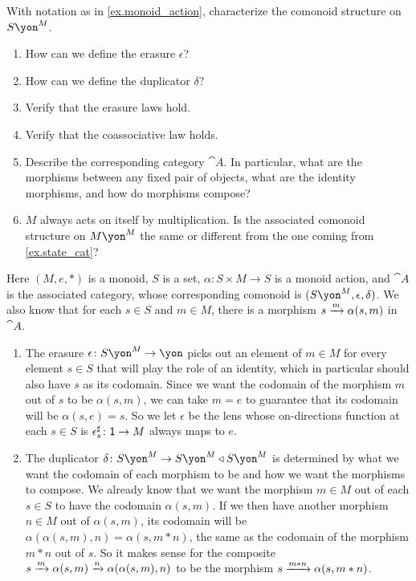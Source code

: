 \documentclass[Book-Poly]{subfiles}
\begin{document}
\begin{exercise}
With notation as in \cref{ex.monoid_action}, characterize the comonoid structure on $S\yon^M$.
\begin{enumerate}
    \item How can we define the erasure $\epsilon$?
    \item How can we define the duplicator $\delta$?
    \item Verify that the erasure laws hold.
    \item Verify that the coassociative law holds.
    \item Describe the corresponding category $\cat{A}$.
    In particular, what are the morphisms between any fixed pair of objects, what are the identity morphisms, and how do morphisms compose?
	\item $M$ always acts on itself by multiplication. Is the associated comonoid structure on $M\yon^M$ the same or different from the one coming from \cref{ex.state_cat}?
\qedhere
\end{enumerate}
\begin{solution}
Here $(M,e,*)$ is a monoid, $S$ is a set, $\alpha\colon S\times M\to S$ is a monoid action, and $\cat{A}$ is the associated category, whose corresponding comonoid is $(S\yon^M,\epsilon,\delta)$.
We also know that for each $s\in S$ and $m\in M$, there is a morphism $s\xrightarrow{m} \alpha(s,m)$ in $\cat{A}$.
\begin{enumerate}
    \item The erasure $\epsilon\colon S\yon^M\to\yon$ picks out an element of $m\in M$ for every element $s\in S$ that will play the role of an identity, which in particular should also have $s$ as its codomain.
    Since we want the codomain of the morphism $m$ out of $s$ to be $\alpha(s,m)$, we can take $m=e$ to guarantee that its codomain will be $\alpha(s,e)=s$.
    So we let $\epsilon$ be the lens whose on-directions function at each $s\in S$ is $\epsilon^\sharp_s\colon\textsf{1}\to M$ always maps to $e$.
    \item The duplicator $\delta\colon S\yon^M\to S\yon^M\tri S\yon^M$ is determined by what we want the codomain of each morphism to be and how we want the morphisms to compose.
    We already know that we want the morphism $m\in M$ out of each $s\in S$ to have the codomain $\alpha(s,m)$.
    If we then have another morphism $n\in M$ out of $\alpha(s,m)$, its codomain will be $\alpha(\alpha(s,m),n)=\alpha(s,m*n)$, the same as the codomain of the morphism $m*n$ out of $s$.
    So it makes sense for the composite $s\xrightarrow{m}\alpha(s,m)\xrightarrow{n} \alpha(\alpha(s,m),n)$ to be the morphism $s\xrightarrow{m*n}\alpha(s,m*n)$.

\end{enumerate}
\end{solution}
\end{exercise}
\end{document}
